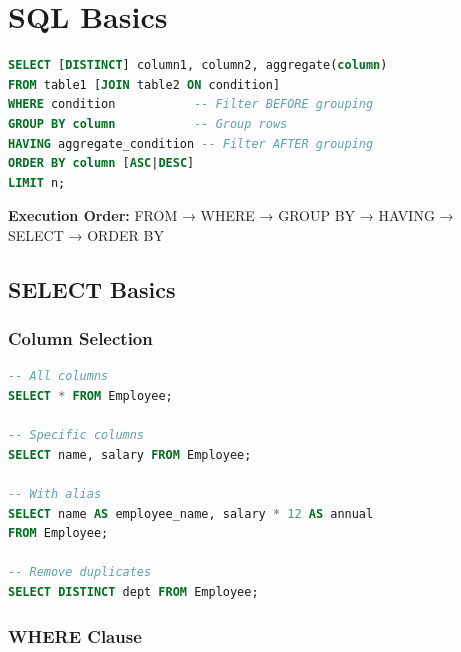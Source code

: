 
\chapter{SQL Basics}

\begin{formulabox}
\begin{lstlisting}[language=SQL]
SELECT [DISTINCT] column1, column2, aggregate(column)
FROM table1 [JOIN table2 ON condition]
WHERE condition           -- Filter BEFORE grouping
GROUP BY column           -- Group rows
HAVING aggregate_condition -- Filter AFTER grouping
ORDER BY column [ASC|DESC]
LIMIT n;
\end{lstlisting}

\textbf{Execution Order:} FROM → WHERE → GROUP BY → HAVING → SELECT → ORDER BY
\end{formulabox}

\section{SELECT Basics}

\subsection{Column Selection}

\begin{examplebox}
\begin{lstlisting}[language=SQL]
-- All columns
SELECT * FROM Employee;

-- Specific columns
SELECT name, salary FROM Employee;

-- With alias
SELECT name AS employee_name, salary * 12 AS annual
FROM Employee;

-- Remove duplicates
SELECT DISTINCT dept FROM Employee;
\end{lstlisting}
\end{examplebox}

\subsection{WHERE Clause}

